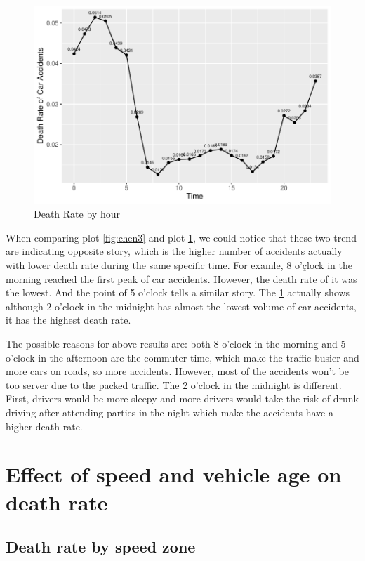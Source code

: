 \documentclass[11pt,a4paper,]{article}
\begin{document}
\begin{figure}
\centering
\includegraphics{Report_files/figure-latex/chen4-1.pdf}
\caption{\label{fig:chen4}Death Rate by hour}
\end{figure}

When comparing plot \ref{fig:chen3} and plot \ref{fig:chen4}, we could notice that these two trend are indicating opposite story, which is the higher number of accidents actually with lower death rate during the same specific time. For examle, 8 o'çlock in the morning reached the first peak of car accidents. However, the death rate of it was the lowest. And the point of 5 o'clock tells a similar story. The \ref{fig:chen4} actually shows although 2 o'clock in the midnight has almost the lowest volume of car accidents, it has the highest death rate.

The possible reasons for above results are: both 8 o'clock in the morning and 5 o'clock in the afternoon are the commuter time, which make the traffic busier and more cars on roads, so more accidents. However, most of the accidents won't be too server due to the packed traffic. The 2 o'clock in the midnight is different. First, drivers would be more sleepy and more drivers would take the risk of drunk driving after attending parties in the night which make the accidents have a higher death rate.

\section*{Effect of speed and vehicle age on death rate}

\subsection*{Death rate by speed zone}
\end{document}

